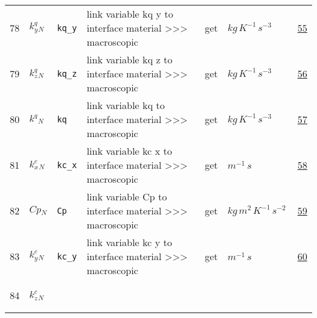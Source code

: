 \begin{longtable}{|p{1cm}|p{2.5cm}|p{4.5cm}|p{8cm}|p{3.0cm}|p{3cm}|p{1cm}|}
    78
             & \hypertarget{"v:78"}{ $ {{k^q_y}}{_{N}} $}
             & \verb|kq_y|
             & link variable kq y to interface material >>> macroscopic
             & \begin{lay}get \end{lay}
             & $ kg \,K^{-1} \,s^{-3} \, $
             & \hyperlink{"e:55"}{ 55 }
                 \\
    79
             & \hypertarget{"v:79"}{ $ {{k^q_z}}{_{N}} $}
             & \verb|kq_z|
             & link variable kq z to interface material >>> macroscopic
             & \begin{lay}get \end{lay}
             & $ kg \,K^{-1} \,s^{-3} \, $
             & \hyperlink{"e:56"}{ 56 }
                 \\
    80
             & \hypertarget{"v:80"}{ $ {{k^q}}{_{N}} $}
             & \verb|kq|
             & link variable kq to interface material >>> macroscopic
             & \begin{lay}get \end{lay}
             & $ kg \,K^{-1} \,s^{-3} \, $
             & \hyperlink{"e:57"}{ 57 }
                 \\
    81
             & \hypertarget{"v:81"}{ $ {{k^c_x}}{_{N}} $}
             & \verb|kc_x|
             & link variable kc x to interface material >>> macroscopic
             & \begin{lay}get \end{lay}
             & $ m^{-1} \,s \, $
             & \hyperlink{"e:58"}{ 58 }
                 \\
    82
             & \hypertarget{"v:82"}{ $ {Cp}{_{N}} $}
             & \verb|Cp|
             & link variable Cp to interface material >>> macroscopic
             & \begin{lay}get \end{lay}
             & $ kg \,m^{2} \,K^{-1} \,s^{-2} \, $
             & \hyperlink{"e:59"}{ 59 }
                 \\
    83
             & \hypertarget{"v:83"}{ $ {{k^c_y}}{_{N}} $}
             & \verb|kc_y|
             & link variable kc y to interface material >>> macroscopic
             & \begin{lay}get \end{lay}
             & $ m^{-1} \,s \, $
             & \hyperlink{"e:60"}{ 60 }
                 \\
    84
             & \hypertarget{"v:84"}{ $ {{k^c_z}}{_{N}} $}

\end{longtable}
